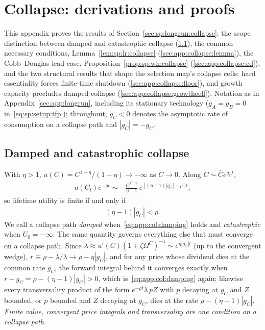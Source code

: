 \section{Collapse: derivations and proofs}\label{sec:app:collapse}

This appendix proves the results of Section~\ref{sec:sp:longrun:collapse}: the scope
distinction between damped and catastrophic collapse (\ref{sec:app:collapse:scope}), the
common necessary conditions, Lemma~\ref{lem:sp:lr:collapse} (\ref{sec:app:collapse:lemma}),
the Cobb--Douglas lead case, Proposition~\ref{prop:sp:wh:collapse}
(\ref{sec:app:collapse:cd}), and the two structural results that shape the selection map's
collapse cells: hard essentiality forces finite-time shutdown
(\ref{sec:app:collapse:floor}), and growth capacity precludes damped collapse
(\ref{sec:app:collapse:growthcell}). Notation as in Appendix~\ref{sec:app:longrun},
including its stationary technology ($g_A=g_B=0$ in~\eqref{eq:sp:setup:tfp});
throughout, $g_C<0$ denotes the asymptotic rate of consumption on a collapse path and
$\left|g_C\right|=-g_C$.

\subsection{Damped and catastrophic collapse}\label{sec:app:collapse:scope}

With $\eta>1$, $u\left(C\right)=C^{1-\eta}/\left(1-\eta\right)\to-\infty$ as $C\to0$. Along
$C\sim\bar Ce^{g_Ct}$,
\begin{align}
u\left(C_t\right)e^{-\rho t}\sim-\frac{\bar C^{1-\eta}}{\eta-1}\,
e^{\left[\left(\eta-1\right)\left|g_C\right|-\rho\right]t},
\label{eq:app:col:value}
\end{align}
so lifetime utility is finite if and only if
\begin{align}
\left(\eta-1\right)\left|g_C\right|<\rho .
\label{eq:app:col:damping}
\end{align}
We call a collapse path \emph{damped} when~\eqref{eq:app:col:damping} holds and
\emph{catastrophic} when $U_0=-\infty$. The same quantity governs everything else that must
converge on a collapse path. Since $\lambda\approx u'\left(C\right)\left(1+\zeta\Omega^C\right)^{-1}
\sim e^{\eta\left|g_C\right|t}$ (up to the convergent wedge),
$r\equiv\rho-\dot\lambda/\lambda\to\rho-\eta\left|g_C\right|$, and for any price whose
dividend dies at the common rate $g_C$, the forward integral behind it converges exactly when
$r-g_C=\rho-\left(\eta-1\right)\left|g_C\right|>0$, which is~\eqref{eq:app:col:damping}
again; likewise every transversality product of the form $e^{-\rho t}\lambda\,pZ$ with $p$
decaying at $g_C$ and $Z$ bounded, or $p$ bounded and $Z$ decaying at $g_C$, dies at the rate
$\rho-\left(\eta-1\right)\left|g_C\right|$. \emph{Finite value, convergent price integrals and
transversality are one condition on a collapse path.}

